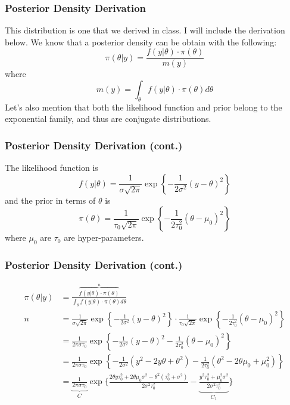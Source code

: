 \documentclass[10pt]{beamer}
\begin{document}
\begin{frame}
\frametitle{Posterior Density Derivation}
	This distribution is one that we derived in class. I will include the derivation below. We know that a posterior density can be obtain with the following: $$\pi(\theta|y)=\frac{f(y|\theta)\cdot\pi(\theta)}{m(y)}$$ where $$m(y)=\int_{\theta}f(y|\theta)\cdot\pi(\theta)d\theta$$ Let's also mention that both the likelihood function and prior belong to the exponential family, and thus are conjugate distributions.
\end{frame}

\begin{frame}
\frametitle{Posterior Density Derivation (cont.)}
	The likelihood function is $$f(y|\theta)=\frac{1}{\sigma\sqrt{2\pi}}\exp\left\{-\frac{1}{2\sigma^2}\left(y-\theta\right)^2\right\}$$ and the prior in terms of $\theta$ is $$\pi(\theta)=\frac{1}{\tau_0\sqrt{2\pi}}\exp\left\{-\frac{1}{2\tau_0^2}\left(\theta-\mu_0\right)^2\right\}$$ where $\mu_0$ are $\tau_0$ are hyper-parameters.
\end{frame}

\begin{frame}
\frametitle{Posterior Density Derivation (cont.)}
	\begin{align*}
		\pi(\theta|y)&=\frac{\overbrace{f(y|\theta)\cdot\pi(\theta)}^{n}}{\int_{\theta}f(y|\theta)\cdot\pi(\theta)d\theta}\\
		n&=\frac{1}{\sigma\sqrt{2\pi}}\exp\left\{-\frac{1}{2\sigma^2}\left(y-\theta\right)^2\right\}\cdot\frac{1}{\tau_0\sqrt{2\pi}}\exp\left\{-\frac{1}{2\tau_0^2}\left(\theta-\mu_0\right)^2\right\}\\
		&=\frac{1}{2\pi\sigma\tau_0}\exp\left\{-\frac{1}{2\sigma^2}\left(y-\theta\right)^2-\frac{1}{2\tau_0^2}\left(\theta-\mu_0\right)^2\right\}\\
		&=\frac{1}{2\pi\sigma\tau_0}\exp\left\{-\frac{1}{2\sigma^2}\left(y^2-2y\theta+\theta^2\right)-\frac{1}{2\tau_0^2}\left(\theta^2-2\theta\mu_0+\mu_0^2\right)\right\}\\
		&=\underbrace{\frac{1}{2\pi\sigma\tau_0}}_{C}\exp\bigg\{\frac{2\theta y\tau_0^2+2\theta\mu_0\sigma^2-\theta^2\left(\tau_0^2+\sigma^2\right)}{2\sigma^2\tau_0^2}-\underbrace{\frac{y^2\tau_0^2+\mu_0^2\sigma^2}{2\sigma^2\tau_0^2}}_{C_1}\bigg\}
	\end{align*}
\end{frame}
\end{document}
